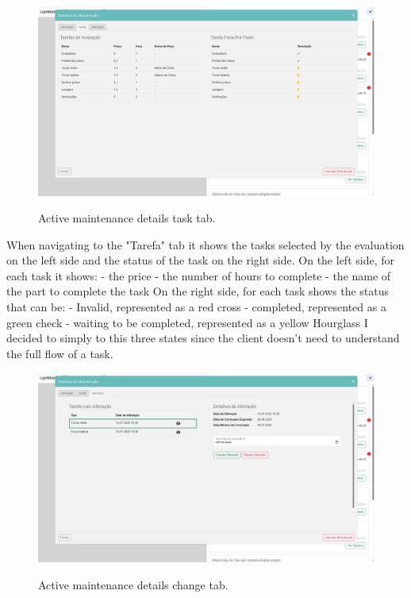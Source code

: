 \begin{figure}[h]
  \caption{Active maintenance details task tab.}
  \centering
  \includegraphics[width=\textwidth]{figs/Implementation/rececionist/maintenance_details_task}
  \label{fig:figure2}
\end{figure}

When navigating to the "Tarefa" tab it shows the tasks selected by the evaluation on the left side and the status of the task on the right side.
On the left side, for each task it shows:
- the price 
- the number of hours to complete
- the name of the part to complete the task
On the right side, for each task shows the status that can be:
- Invalid, represented as a red cross
- completed, represented as a green check 
- waiting to be completed, represented as a yellow Hourglass
I decided to simply to this three states since the client doesn't need to understand the full flow of a task.


\begin{figure}[h]
  \caption{Active maintenance details change tab.}
  \centering
  \includegraphics[width=\textwidth]{figs/Implementation/rececionist/maintenance_details_change}
  \label{fig:figure2}
\end{figure}

